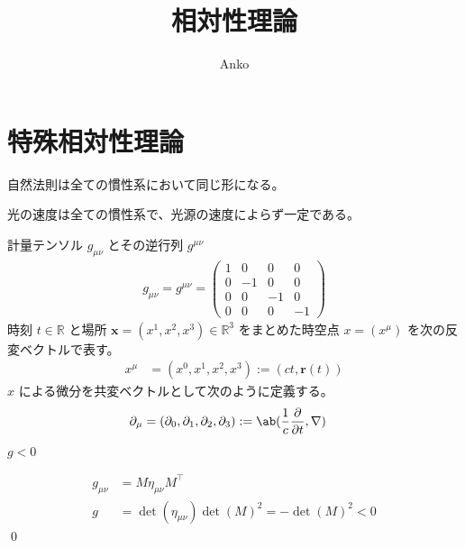 \documentclass[uplatex,dvipdfmx,a4paper,11pt]{jlreq}
\title{相対性理論}
\author{Anko}
\makeatletter
\newcommand{\RR}{\mathbb{R}}
\newcommand{\rr}{\bm{r}}
\theoremstyle{definition}
\renewenvironment{proof}[1][\proofname]{\par
  \normalfont
  \topsep6\p@\@plus6\p@ \trivlist
  \item[\hskip\labelsep{\bfseries #1}\@addpunct{\bfseries}]\ignorespaces\quad\par
}{%
  \qed\endtrivlist\@endpefalse
}
\renewcommand\proofname{証明}
\makeatother
\begin{document}
\maketitle
\tableofcontents
\clearpage

\section{特殊相対性理論}
\begin{definition}
  自然法則は全ての慣性系において同じ形になる。
\end{definition}
\begin{definition}[光速度不変の原理]
  光の速度は全ての慣性系で、光源の速度によらず一定である。
\end{definition}

\begin{definition}
  計量テンソル $g_{\mu\nu}$ とその逆行列 $g^{\mu\nu}$
  \begin{align}
    g_{\mu\nu} = g^{\mu\nu} = \begin{pmatrix}
                                1 & 0 & 0 & 0 \\ 0 & -1 & 0 & 0 \\ 0 & 0 & -1 & 0 \\ 0 & 0 & 0 & -1
                              \end{pmatrix}
  \end{align}
  時刻 $t\in\RR$ と場所 $\bm{x} = (x^1, x^2, x^3)\in\RR^3$ をまとめた時空点 $x = (x^\mu)$ を次の反変ベクトルで表す。
  \begin{align}
    x^\mu & = (x^0, x^1, x^2, x^3) := (ct, \rr(t))
  \end{align}
  $x$ による微分を共変ベクトルとして次のように定義する。
  \begin{align}
    \partial_\mu & = (\partial_0, \partial_1, \partial_2, \partial_3) := \ab(\frac{1}{c}\diffp{}{t}, \nabla)
  \end{align}
\end{definition}

\begin{proposition}
  $g < 0$
\end{proposition}
\begin{proof}
  \begin{align}
    g_{\mu\nu} & = M\eta_{\mu\nu}M^\top                          \\
    g          & = \det(\eta_{\mu\nu})\det(M)^2 = -\det(M)^2 < 0
  \end{align}
\end{proof}
\end{document}
